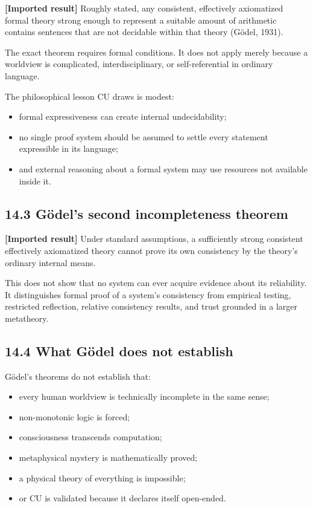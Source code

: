 \documentclass[
  11pt,
]{article}
\providecommand{\tightlist}{%
  \setlength{\itemsep}{0pt}\setlength{\parskip}{0pt}}
\begin{document}
\textbf{{[}Imported result{]}} Roughly stated, any consistent,
effectively axiomatized formal theory strong enough to represent a
suitable amount of arithmetic contains sentences that are not decidable
within that theory (Gödel, 1931).

The exact theorem requires formal conditions. It does not apply merely
because a worldview is complicated, interdisciplinary, or
self-referential in ordinary language.

The philosophical lesson CU draws is modest:

\begin{itemize}
\tightlist
\item
  formal expressiveness can create internal undecidability;
\item
  no single proof system should be assumed to settle every statement
  expressible in its language;
\item
  and external reasoning about a formal system may use resources not
  available inside it.
\end{itemize}

\subsection{14.3 Gödel's second incompleteness
theorem}\label{guxf6dels-second-incompleteness-theorem}

\textbf{{[}Imported result{]}} Under standard assumptions, a
sufficiently strong consistent effectively axiomatized theory cannot
prove its own consistency by the theory's ordinary internal means.

This does not show that no system can ever acquire evidence about its
reliability. It distinguishes formal proof of a system's consistency
from empirical testing, restricted reflection, relative consistency
results, and trust grounded in a larger metatheory.

\subsection{14.4 What Gödel does not
establish}\label{what-guxf6del-does-not-establish}

Gödel's theorems do not establish that:

\begin{itemize}
\tightlist
\item
  every human worldview is technically incomplete in the same sense;
\item
  non-monotonic logic is forced;
\item
  consciousness transcends computation;
\item
  metaphysical mystery is mathematically proved;
\item
  a physical theory of everything is impossible;
\item
  or CU is validated because it declares itself open-ended.
\end{itemize}
\end{document}
